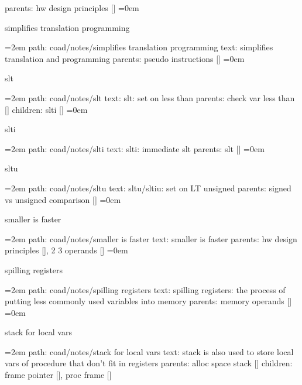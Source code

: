 \smallskip
parents:  hw design principles []
\smallskip
\leftskip=0em
\par\endgroup
\bigskip
{}
simplifies translation programming
\smallskip
\par\begingroup
\leftskip=2em
path: coad/notes/simplifies translation programming
\smallskip
text:  simplifies translation and programming
\smallskip
parents:  pseudo instructions []
\smallskip
\leftskip=0em
\par\endgroup
\bigskip
{}
slt
\smallskip
\par\begingroup
\leftskip=2em
path: coad/notes/slt
\smallskip
text:  slt: set on less than
\smallskip
parents:  check var less than []
\smallskip
children: slti []
\smallskip
\leftskip=0em
\par\endgroup
\bigskip
{}
slti
\smallskip
\par\begingroup
\leftskip=2em
path: coad/notes/slti
\smallskip
text:  slti: immediate slt
\smallskip
parents:  slt []
\smallskip
\leftskip=0em
\par\endgroup
\bigskip
{}
sltu
\smallskip
\par\begingroup
\leftskip=2em
path: coad/notes/sltu
\smallskip
text:  sltu/sltiu: set on LT unsigned
\smallskip
parents:  signed vs unsigned comparison []
\smallskip
\leftskip=0em
\par\endgroup
\bigskip
{}
smaller is faster
\smallskip
\par\begingroup
\leftskip=2em
path: coad/notes/smaller is faster
\smallskip
text:  smaller is faster
\smallskip
parents:  hw design principles [], 2 3 operands []
\smallskip
\leftskip=0em
\par\endgroup
\bigskip
{}
spilling registers
\smallskip
\par\begingroup
\leftskip=2em
path: coad/notes/spilling registers
\smallskip
text:  spilling registers: the process of putting less commonly used variables into memory
\smallskip
parents:  memory operands []
\smallskip
\leftskip=0em
\par\endgroup
\bigskip
{}
stack for local vars
\smallskip
\par\begingroup
\leftskip=2em
path: coad/notes/stack for local vars
\smallskip
text:  stack is also used to store local vars of procedure that don't fit in registers
\smallskip
parents:  alloc space stack []
\smallskip
children: frame pointer [], proc frame []
\smallskip
